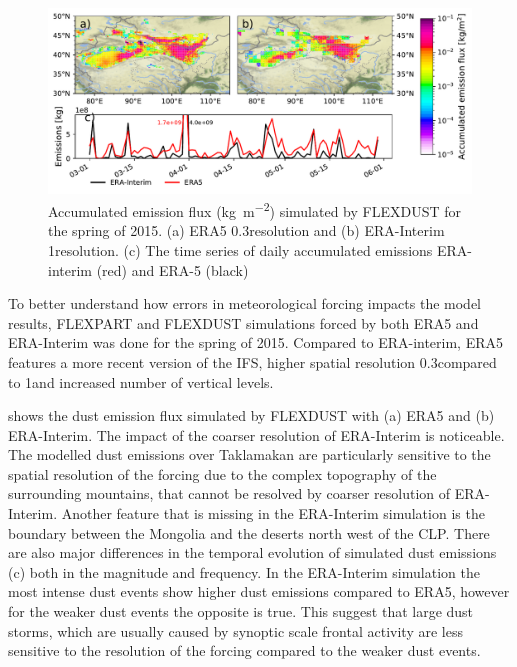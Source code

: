 \begin{figure}[htpb]
    \centering
    \includegraphics[width=\textwidth]{texfiles/figs/emissions_ERA5_ERA-interim.pdf}
    \caption{Accumulated emission flux  (\si{\kg\per\square\metre}) simulated by FLEXDUST for the spring of 2015. (a) ERA5 0.3\degree resolution and (b) ERA-Interim 1\degree resolution. (c) The time series of daily accumulated emissions ERA-interim (red) and ERA-5 (black) }
    \label{fig:ERA5_ERA-interim_emissions}
\end{figure}
To better understand how errors in meteorological forcing impacts the model results, FLEXPART and FLEXDUST simulations forced by both ERA5 and ERA-Interim was done for the spring of 2015. Compared to ERA-interim, ERA5 features a more recent version of the IFS, higher spatial resolution 0.3\degree compared to 1\degree and increased number of vertical levels. 
\par {} shows the dust emission flux simulated by FLEXDUST with (a) ERA5 and (b) ERA-Interim. The impact of the coarser resolution of ERA-Interim is noticeable.  The modelled dust emissions over Taklamakan are particularly sensitive to the spatial resolution of the forcing due to the complex topography of the surrounding mountains, that cannot be resolved by coarser resolution of ERA-Interim. Another feature that is missing in the ERA-Interim simulation is the boundary between the Mongolia and the deserts north west of the CLP. There are also major differences in the temporal evolution of simulated dust emissions (c) both in the magnitude and frequency. In the ERA-Interim simulation the most intense dust events show higher dust emissions compared to ERA5, however for the weaker dust events the opposite is true. This suggest that large dust storms, which are usually caused by synoptic scale frontal activity are less sensitive to the resolution of the forcing compared to the weaker dust events.


